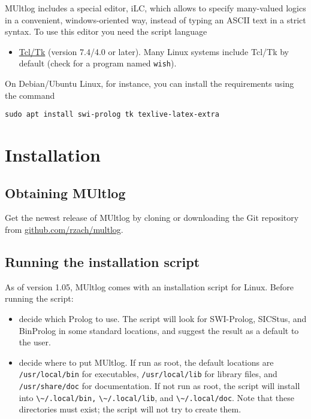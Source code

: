 \documentclass[
]{article}
\newcommand{\passthrough}[1]{#1}
\providecommand{\tightlist}{%
  \setlength{\itemsep}{0pt}\setlength{\parskip}{0pt}}
\begin{document}
MUltlog includes a special editor, iLC, which allows to specify
many-valued logics in a convenient, windows-oriented way, instead of
typing an ASCII text in a strict syntax. To use this editor you need the
script language

\begin{itemize}
\tightlist
\item
  \href{https://www.tcl.tk/}{Tcl/Tk} (version 7.4/4.0 or later). Many
  Linux systems include Tcl/Tk by default (check for a program named
  \passthrough{\lstinline!wish!}).
\end{itemize}

On Debian/Ubuntu Linux, for instance, you can install the requirements
using the command

\begin{lstlisting}
sudo apt install swi-prolog tk texlive-latex-extra
\end{lstlisting}

\hypertarget{installation}{%
\section{Installation}\label{installation}}

\hypertarget{obtaining-multlog}{%
\subsection{Obtaining MUltlog}\label{obtaining-multlog}}

Get the newest release of MUltlog by cloning or downloading the Git
repository from
\href{https://github.com/rzach/multlog}{github.com/rzach/multlog}.

\hypertarget{running-the-installation-script}{%
\subsection{Running the installation
script}\label{running-the-installation-script}}

As of version 1.05, MUltlog comes with an installation script for Linux.
Before running the script:

\begin{itemize}
\item
  decide which Prolog to use. The script will look for SWI-Prolog,
  SICStus, and BinProlog in some standard locations, and suggest the
  result as a default to the user.
\item
  decide where to put MUltlog. If run as root, the default locations are
  \passthrough{\lstinline!/usr/local/bin!} for executables,
  \passthrough{\lstinline!/usr/local/lib!} for library files, and
  \passthrough{\lstinline!/usr/share/doc!} for documentation. If not run
  as root, the script will install into
  \passthrough{\lstinline!\~/.local/bin,!}
  \passthrough{\lstinline!\~/.local/lib!}, and
  \passthrough{\lstinline!\~/.local/doc!}. Note that these directories
  must exist; the script will not try to create them.
\end{itemize}
\end{document}
